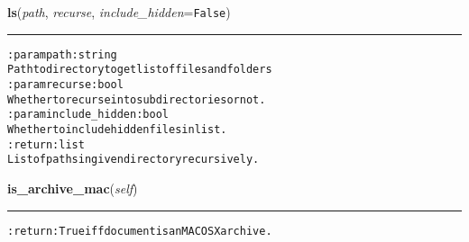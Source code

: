     \label{hal:files:models:FileSystem:ls}

    \vspace{0.5ex}

\hspace{.8\funcindent}\begin{boxedminipage}{\funcwidth}

    \raggedright \textbf{ls}(\textit{path}, \textit{recurse}, \textit{include\_hidden}={\tt False})

    \vspace{-1.5ex}

    \rule{\textwidth}{0.5\fboxrule}
\setlength{\parskip}{2ex}
\begin{alltt}

:param path: string
    Path to directory to get list of files and folders
:param recurse: bool
    Whether to recurse into subdirectories or not.
:param include\_hidden: bool
    Whether to include hidden files in list.
:return: list
    List of paths in given directory recursively.
\end{alltt}

\setlength{\parskip}{1ex}
    \end{boxedminipage}

    \label{hal:files:models:FileSystem:is_archive_mac}

    \vspace{0.5ex}

\hspace{.8\funcindent}\begin{boxedminipage}{\funcwidth}

    \raggedright \textbf{is\_archive\_mac}(\textit{self})

    \vspace{-1.5ex}

    \rule{\textwidth}{0.5\fboxrule}
\setlength{\parskip}{2ex}
\begin{alltt}

:return: True iff document is an MACOSX archive.
\end{alltt}

\setlength{\parskip}{1ex}
    \end{boxedminipage}

